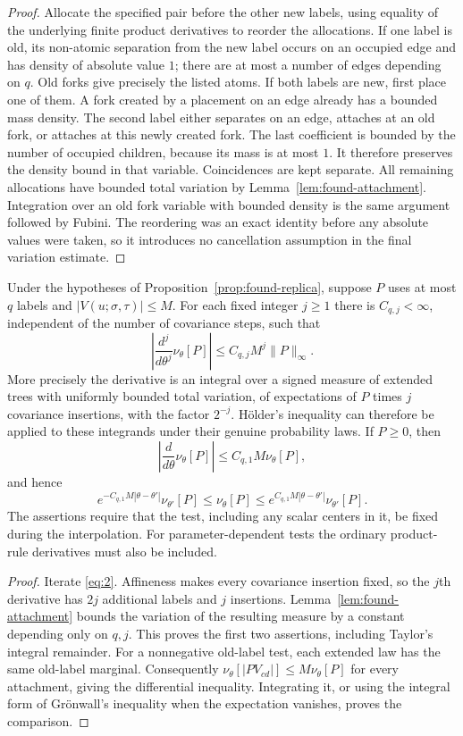 \begin{proof}
Allocate the specified pair before the other new labels, using equality
of the underlying finite product derivatives to reorder the allocations.
If one label is old, its non-atomic separation from the new label occurs
on an occupied edge and has density of absolute value $1$; there are at
most a number of edges depending on $q$. Old forks give precisely the
listed atoms. If both labels are new, first place one of them. A fork
created by a placement on an edge already has a bounded mass density.
The second label either separates on an edge, attaches at an old fork,
or attaches at this newly created fork. The last coefficient is bounded
by the number of occupied children, because its mass is at most $1$.
It therefore preserves the density bound in that variable. Coincidences
are kept separate. All remaining allocations have bounded total
variation by Lemma~\ref{lem:found-attachment}. Integration over an old
fork variable with bounded density is the same argument followed by
Fubini. The reordering was an exact identity before any absolute values
were taken, so it introduces no cancellation assumption in the final
variation estimate.
\end{proof}

\begin{lemma}\label{lem:found-taylor}
Under the hypotheses of Proposition~\ref{prop:found-replica}, suppose
$P$ uses at most $q$ labels and $|V(u;\sigma,\tau)|\leq M$. For each
fixed integer $j\geq1$ there is $C_{q,j}<\infty$, independent of the
number of covariance steps, such that
\[
 \left|\frac{d^j}{d\theta^j}\nu_\theta[P]\right|
       \leq C_{q,j}M^j\|P\|_\infty.
\]
More precisely the derivative is an integral over a signed measure of
extended trees with uniformly bounded total variation, of expectations
of $P$ times $j$ covariance insertions, with the factor $2^{-j}$.
H\"older's inequality can therefore be applied to these integrands
under their genuine probability laws. If $P\geq0$, then
\[
 \left|\frac{d}{d\theta}\nu_\theta[P]\right|
        \leq C_{q,1}M\nu_\theta[P],
\]
and hence
\[
 e^{-C_{q,1}M|\theta-\theta'|}\nu_{\theta'}[P]
 \leq\nu_\theta[P]
 \leq e^{C_{q,1}M|\theta-\theta'|}\nu_{\theta'}[P].
\]
The assertions require that the test, including any scalar centers in
it, be fixed during the interpolation. For parameter-dependent tests
the ordinary product-rule derivatives must also be included.
\end{lemma}

\begin{proof}
Iterate \eqref{eq:2}. Affineness makes every covariance insertion fixed,
so the $j$th derivative has $2j$ additional labels and $j$ insertions.
Lemma~\ref{lem:found-attachment} bounds the variation of the resulting
measure by a constant depending only on $q,j$. This proves the first
two assertions, including Taylor's integral remainder. For a nonnegative
old-label test, each extended law has the same old-label marginal.
Consequently $\nu_\theta[|P V_{cd}|]\leq M\nu_\theta[P]$ for every
attachment, giving the differential inequality. Integrating it, or using
the integral form of Gr\"onwall's inequality when the expectation
vanishes, proves the comparison.
\end{proof}

